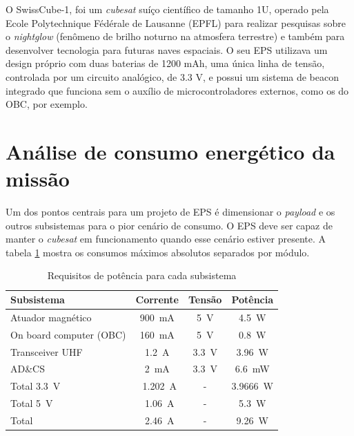 O SwissCube-1, \cite{swisscube_ref}\cite{lessons_swisscube_ref} foi um \textit{cubesat} suíço científico de tamanho 1U, operado pela Ecole Polytechnique Fédérale de Lausanne (EPFL) para realizar pesquisas sobre o \textit{nightglow} (fenômeno de brilho noturno na atmosfera terrestre) e também para desenvolver tecnologia para futuras naves espaciais. O seu EPS utilizava um design próprio com duas baterias de 1200 mAh, uma única linha de tensão, controlada por um circuito analógico, de 3.3 V,  e possui um sistema de beacon integrado que funciona sem o auxílio de microcontroladores externos, como os do OBC, por exemplo.

\section{Análise de consumo energético da missão}

Um dos pontos centrais para um projeto de EPS é dimensionar o \textit{payload} e os outros subsistemas para o pior cenário de consumo. O EPS deve ser capaz de manter o \textit{cubesat} em funcionamento quando esse cenário estiver presente. A tabela \ref{tab:requisites_modules} mostra os consumos máximos absolutos separados por módulo.

\begin{table}[!ht]
    \centering
    \begin{tabular}{l|ccc}
        Subsistema & Corrente & Tensão & Potência \\
        \hline
        Atuador magnético & \SI{900}{\milli\ampere} & \SI{5}{\volt} & \SI{4,5}{\watt}\\
        On board computer (OBC) & \SI{160}{\milli\ampere} & \SI{5}{\volt} & \SI{0.8}{\watt}\\
        Transceiver UHF & \SI{1.2}{\ampere} & \SI{3.3}{\volt} & \SI{3.96}{\watt}\\
        AD\&CS & \SI{2}{\milli\ampere} & \SI{3.3}{\volt} & \SI{6.6}{\milli\watt}\\
        \hline
        Total \SI{3.3}{\volt} & ~\SI{1.202}{\ampere} & - & \SI{3.9666}{\watt}\\
        Total \SI{5}{\volt} & ~\SI{1.06}{\ampere} & - & \SI{5.3}{\watt}\\ \hline
        Total & ~\SI{2.46}{\ampere} & - & \SI{9.26}{\watt}\\
    \end{tabular}
    \caption{Requisitos de potência para cada subsistema}
    \label{tab:requisites_modules}
\end{table}


